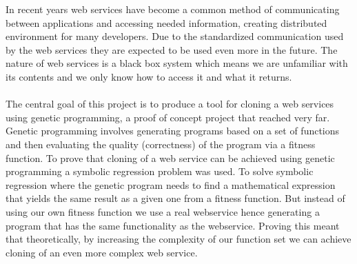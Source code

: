 In recent years web services have become a common method of communicating between applications
and accessing needed information, creating distributed environment for many developers.
Due to the standardized communication used by the web services they are expected to be used even 
more in the future. The nature of web
services is a black box system which means we are unfamiliar with its contents and we only know how to
access it and what it returns. 
\paragraph{}
The central goal of this project is to produce a tool for cloning a web services using genetic
programming, a proof of concept project that reached very far. Genetic programming 
involves generating programs based on a set of functions and then evaluating the quality (correctness)
of the program via a fitness function. To prove that cloning of a web service can be achieved using
genetic programming  a symbolic regression problem was used. To solve symbolic regression where the genetic program needs to find a 
mathematical expression that yields the same result as a given one from a fitness function. But 
instead of using our own fitness function we use a real webservice hence generating a program
that has the same functionality as the webservice. Proving this meant that theoretically, by increasing 
the complexity of our function set we can achieve cloning of an even more complex web service.
